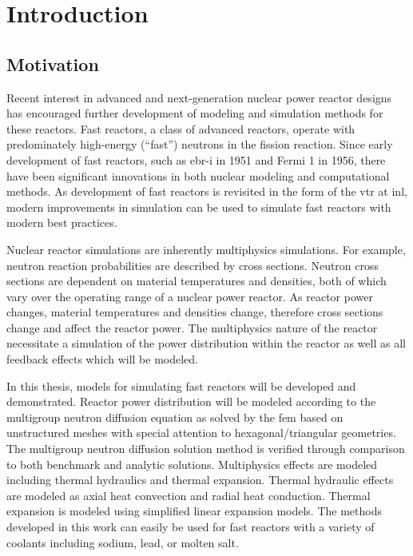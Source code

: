 \chapter{Introduction}
\label{ch:introduction}

\section{Motivation}
  Recent interest in advanced and next-generation nuclear power reactor designs
  has encouraged further development of modeling and simulation methods for
  these reactors.  Fast reactors, a class of advanced reactors, operate with
  predominately high-energy (``fast'') neutrons in the fission reaction. Since
  early development of fast reactors, such as  \gls{ebr-i} in 1951 and Fermi 1
  in 1956, there have been significant innovations in both nuclear modeling and
  computational methods. As development of fast reactors is revisited in the
  form of the \gls{vtr} at \gls{inl}, modern improvements in simulation can be
  used to simulate fast reactors with modern best practices. 
  

  Nuclear reactor simulations are inherently multiphysics simulations. For
  example, neutron reaction probabilities are described by cross sections.
  Neutron cross sections are dependent on material temperatures and densities,
  both of which vary over the operating range of a nuclear power reactor. As
  reactor power changes, material temperatures and densities change, therefore
  cross sections change and affect the reactor power. The multiphysics nature
  of the reactor necessitate a simulation of the power distribution within the
  reactor as well as all feedback effects which will be modeled. 
  
  In this thesis, models for simulating fast reactors will be developed and
  demonstrated. Reactor power distribution will be modeled according to the
  multigroup neutron diffusion equation as solved by the \gls{fem} based on
  unstructured meshes with special attention to hexagonal/triangular geometries.
  The multigroup neutron diffusion solution method is verified through
  comparison to both benchmark and analytic solutions. Multiphysics effects are
  modeled including thermal hydraulics and thermal expansion. Thermal hydraulic
  effects are modeled as axial heat convection and radial heat conduction.
  Thermal expansion is modeled using simplified linear expansion models.  The
  methods developed in this work can easily be used for fast reactors with a
  variety of coolants including sodium, lead, or molten salt.

